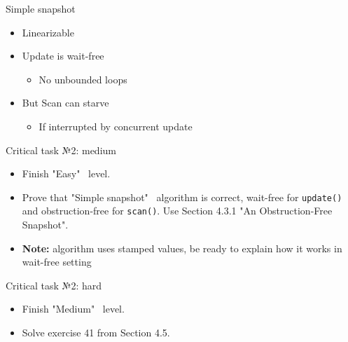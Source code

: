 \begin{frame}[fragile]{Simple snapshot}

\begin{itemize}
  \item Linearizable
  \item Update is wait-free
  \begin{itemize}
    \item No unbounded loops
  \end{itemize}
  \item But Scan can starve 
  \begin{itemize}
    \item If interrupted by concurrent update
  \end{itemize}
\end{itemize}

\end{frame}


\begin{frame}[fragile]{Critical task №2: medium}

\begin{homeworkcritical}
  \begin{itemize}
    \item Finish "Easy" \ level.
    \item  Prove that "Simple snapshot" \ algorithm is correct, wait-free for \texttt{update()} and obstruction-free for \texttt{scan()}.
           Use Section 4.3.1 "An Obstruction-Free Snapshot".
    \item \textbf{Note:} algorithm uses stamped values, be ready to explain how it works in wait-free setting
  \end{itemize}
\end{homeworkcritical}

\end{frame}


\begin{frame}[fragile]{Critical task №2: hard}

\begin{homeworkcritical}
  \begin{itemize}
    \item Finish "Medium" \ level.    
    \item Solve exercise 41 from Section 4.5.
  \end{itemize}
\end{homeworkcritical}
\end{frame}

